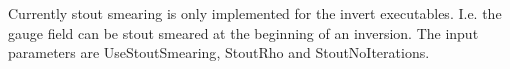Currently stout smearing is only implemented for the {\ttfamily
  invert} executables. I.e. the gauge field can be stout smeared at
the beginning of an inversion. The input parameters are {\ttfamily
  UseStoutSmearing}, {\ttfamily StoutRho} and {\ttfamily
  StoutNoIterations}. 

